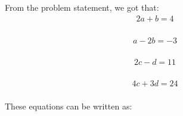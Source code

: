 %      

From the problem statement, we got that:\\

\begin{equation}
\begin{aligned}
2a+b=4\\
\end{aligned}
\end{equation}

\begin{equation}
\begin{aligned}
a-2b=-3\\
\end{aligned}
\end{equation}

\begin{equation}
\begin{aligned}
2c-d=11\\
\end{aligned}
\end{equation}

\begin{equation}
\begin{aligned}
4c+3d=24\\
\end{aligned}
\end{equation}

These equations can be written as:\\

